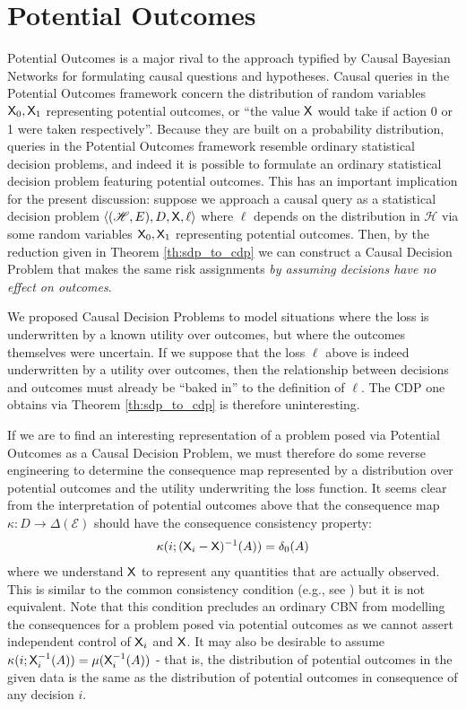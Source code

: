 
\section{Potential Outcomes}

Potential Outcomes is a major rival to the approach typified by Causal Bayesian Networks for formulating causal questions and hypotheses. Causal queries in the Potential Outcomes framework concern the distribution of random variables $\mathsf{X}_0, \mathsf{X}_1$ representing potential outcomes, or ``the value $\mathsf{X}$ would take if action 0 or 1 were taken respectively''. Because they are built on a probability distribution, queries in the Potential Outcomes framework resemble ordinary statistical decision problems, and indeed it is possible to formulate an ordinary statistical decision problem featuring potential outcomes. This has an important implication for the present discussion: suppose we approach a causal query as a statistical decision problem $\langle (\mathscr{H}, E),D,\mathsf{X},\ell\rangle$ where $\ell$ depends on the distribution in $\mathscr{H}$ via some random variables $\mathsf{X}_0,\mathsf{X}_1$ representing potential outcomes. Then, by the reduction given in Theorem \ref{th:sdp_to_cdp} we can construct a Causal Decision Problem that makes the same risk assignments \emph{by assuming decisions have no effect on outcomes}. 

We proposed Causal Decision Problems to model situations where the loss is underwritten by a known utility over outcomes, but where the outcomes themselves were uncertain. If we suppose that the loss $\ell$ above is indeed underwritten by a utility over outcomes, then the relationship between decisions and outcomes must already be ``baked in'' to the definition of $\ell$. The CDP one obtains via Theorem \ref{th:sdp_to_cdp} is therefore uninteresting.

If we are to find an interesting representation of a problem posed via Potential Outcomes as a Causal Decision Problem, we must therefore do some reverse engineering to determine the consequence map represented by a distribution over potential outcomes and the utility underwriting the loss function. It seems clear from the interpretation of potential outcomes above that the consequence map $\kappa:D\to\Delta(\mathcal{E})$ should have the consequence consistency property:
\begin{align}
    \kappa(i;(\mathsf{X}_i-\mathsf{X})^{-1}(A))=\delta_0(A) \label{eq:oc_consist}
\end{align} 
where we understand $\mathsf{X}$ to represent any quantities that are actually observed. This is similar to the common consistency condition (e.g., see \cite{richardson2013single}) but it is not equivalent. Note that this condition precludes an ordinary CBN from modelling the consequences for a problem posed via potential outcomes as we cannot assert independent control of $\mathsf{X}_i$ and $\mathsf{X}$. It may also be desirable to assume $\kappa(i;\mathsf{X}_i^{-1}(A))=\mu(\mathsf{X}_i^{-1}(A))$ - that is, the distribution of potential outcomes in the given data is the same as the distribution of potential outcomes in consequence of any decision $i$.

